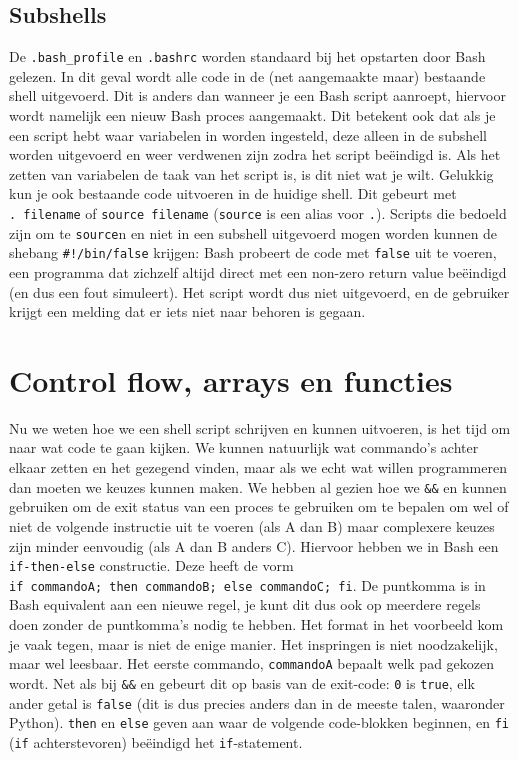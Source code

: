 \subsection{Subshells}\label{subshells}

De \texttt{.bash\_profile} en \texttt{.bashrc} worden standaard bij het opstarten door Bash gelezen. In dit geval wordt alle code in de (net aangemaakte maar) bestaande shell uitgevoerd. Dit is anders dan wanneer je een Bash script aanroept, hiervoor wordt namelijk een nieuw Bash proces aangemaakt. Dit betekent ook dat als je een script hebt waar variabelen in worden ingesteld, deze alleen in de subshell worden uitgevoerd en weer verdwenen zijn zodra het script beëindigd is. Als het zetten van variabelen de taak van het script is, is dit niet wat je wilt. Gelukkig kun je ook bestaande code uitvoeren in de huidige shell. Dit gebeurt met \texttt{.\ filename} of \texttt{source\ filename} (\texttt{source} is een alias voor \texttt{.}). Scripts die bedoeld zijn om te \texttt{source}n en niet in een subshell uitgevoerd mogen worden kunnen de shebang \texttt{\#!/bin/false} krijgen: Bash probeert de code met \texttt{false} uit te voeren, een programma dat zichzelf altijd direct met een non-zero return value beëindigd (en dus een fout simuleert). Het script wordt dus niet uitgevoerd, en de gebruiker krijgt een melding dat er iets niet naar behoren is gegaan.

\section{Control flow, arrays en functies}\label{control-flow-en-arrays}

Nu we weten hoe we een shell script schrijven en kunnen uitvoeren, is het tijd om naar wat code te gaan kijken. We kunnen natuurlijk wat commando's achter elkaar zetten en het gezegend vinden, maar als we echt wat willen programmeren dan moeten we keuzes kunnen maken. We hebben al gezien hoe we \texttt{\&\&} en \texttt{\textbar{}\textbar{}} kunnen gebruiken om de exit status van een proces te gebruiken om te bepalen om wel of niet de volgende instructie uit te voeren (als A dan B) maar complexere keuzes zijn minder eenvoudig (als A dan B anders C). Hiervoor hebben we in Bash een \texttt{if-then-else} constructie. Deze heeft de vorm \texttt{if\ commandoA;\ then\ commandoB;\ else\ commandoC;\ fi}. De puntkomma is in Bash equivalent aan een nieuwe regel, je kunt dit dus ook op meerdere regels doen zonder de puntkomma's nodig te hebben. Het format in het voorbeeld kom je vaak tegen, maar is niet de enige manier. Het inspringen is niet noodzakelijk, maar wel leesbaar. Het eerste commando, \texttt{commandoA} bepaalt welk pad gekozen wordt. Net als bij \texttt{\&\&} en \texttt{\textbar{}\textbar{}} gebeurt dit op basis van de exit-code: \texttt{0} is \texttt{true}, elk ander getal is \texttt{false} (dit is dus precies anders dan in de meeste talen, waaronder Python). \texttt{then} en \texttt{else} geven aan waar de volgende code-blokken beginnen, en \texttt{fi} (\texttt{if} achterstevoren) beëindigd het \texttt{if}-statement.

